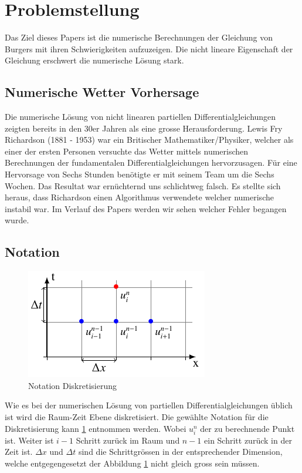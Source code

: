 %
%
\section{Problemstellung
\label{burgers:section:problemstellung}}

	Das Ziel dieses Papers ist die numerische Berechnungen der Gleichung von Burgers mit ihren Schwierigkeiten aufzuzeigen.
	Die nicht lineare Eigenschaft der Gleichung erschwert die numerische L\"osung stark.
	 
	
	\subsection{Numerische Wetter Vorhersage}
	\label{burgers:sec:nwp}
	
	Die numerische L\"osung von nicht linearen partiellen Differentialgleichungen zeigten bereits in den 30er Jahren als eine grosse Herausforderung.
	Lewis Fry Richardson (1881 - 1953) war ein Britischer Mathematiker/Physiker, welcher als einer der ersten Personen versuchte das Wetter mittels numerischen Berechnungen der fundamentalen Differentialgleichungen hervorzusagen.
	F\"ur eine Hervorsage von Sechs Stunden ben\"otigte er mit seinem Team um die Sechs Wochen.
	Das Resultat war ern\"uchternd uns schlichtweg falsch.
	Es stellte sich heraus, dass Richardson einen Algorithmus verwendete welcher numerische instabil war.
	Im Verlauf des Papers werden wir sehen welcher Fehler begangen wurde.
	
	\subsection{Notation}
	
     \begin{figure}
       \centering
       \includegraphics[height=.4\textwidth]{papers/burgers/BurgersEquation/tikz/Gitter/gitter.pdf}
       \caption{Notation Diskretisierung}
       \label{burgers:fig:Disk}
     \end{figure}
     

     Wie es bei der numerischen L\"osung von partiellen Differentialgleichungen \"ublich ist wird die Raum-Zeit Ebene  diskretisiert.
     Die gew\"ahlte Notation f\"ur die Diskretisierung kann \ref{burgers:fig:Disk} entnommen werden.
     Wobei $u_i^n$ der zu berechnende Punkt ist.
     Weiter ist $i-1$ Schritt zur\"uck im Raum und $n-1$ ein Schritt zur\"uck in der Zeit ist.
     $\Delta x$ und $\Delta t$ sind die Schrittgr\"ossen in der entsprechender Dimension, welche entgegengesetzt der Abbildung \ref{burgers:fig:Disk} nicht gleich gross sein m\"ussen.
     